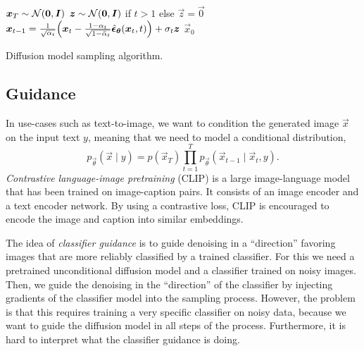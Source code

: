 \begin{algorithm}
    \begin{algorithmic}[1]
        \State $\bm{x}_T \sim \mathcal{N}(\bm{0}, \bm{I})$
        \State $\bm{z} \sim \mathcal{N}(\bm{0}, \bm{I})$ if $t > 1$ else $\vec{z} = \vec{0}$
        \State $\vec{x}_{t-1} = \frac{1}{\sqrt{\alpha_t}} \lft( \vec{x}_t - \frac{1 - \alpha_t}{\sqrt{1 - \bar{\alpha}_t}} \hat{\vec{\epsilon}}_{\vec{\theta}}(\vec{x}_t, t) \rgt) + \sigma_t \vec{z}$
        \EndFor
        \State \Return $\vec{x}_0$
    \end{algorithmic}
    \caption{Diffusion model sampling algorithm.}
\end{algorithm}

\subsection{Guidance}

In use-cases such as text-to-image, we want to condition the generated image $\vec{x}$ on the input
text $y$, meaning that we need to model a conditional distribution, \[
    p_{\vec{\theta}}(\vec{x}\mid y) = p(\vec{x}_T) \prod_{t=1}^{T}  p_{\vec{\theta}}(\vec{x}_{t-1} \mid \vec{x}_t, y).
\]
\textit{Contrastive language-image pretraining} (CLIP) \citep{radford2021learning} is a large
image-language model that has been trained on image-caption pairs. It consists of an image encoder
and a text encoder network. By using a contrastive loss, CLIP is encouraged to encode the image and
caption into similar embeddings.

The idea of \textit{classifier guidance} is to guide denoising in a ``direction'' favoring images
that are more reliably classified by a trained classifier. For this we need a pretrained
unconditional diffusion model and a classifier trained on noisy images. Then, we guide the denoising
in the ``direction'' of the classifier by injecting gradients of the classifier model into the
sampling process. However, the problem is that this requires training a very specific classifier on
noisy data, because we want to guide the diffusion model in all steps of the process. Furthermore, it
is hard to interpret what the classifier guidance is doing.

